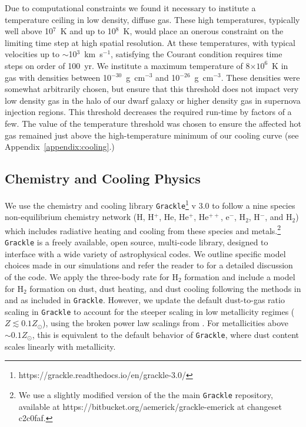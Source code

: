 Due to computational constraints we found it necessary to institute a temperature ceiling in low density, diffuse gas. These high temperatures, typically well above 10$^{7}$~K and up to 10$^{8}$~K, would place an onerous constraint on the limiting time step at high spatial resolution. At these temperatures, with typical velocities up to $\sim$10$^{3}$~km~s$^{-1}$, satisfying the Courant condition requires time steps on order of 100~yr. We institute a maximum temperature of 8$\times 10^6$~K in gas with densities between 10$^{-30}$~g~cm$^{-3}$ and 10$^{-26}$~g~cm$^{-3}$. These densities were somewhat arbitrarily chosen, but ensure that this threshold does not impact very low density gas in the halo of our dwarf galaxy or higher density gas in supernova injection regions. This threshold decreases the required run-time by factors of a few. The value of the temperature threshold was chosen to ensure the affected hot gas remained just above the high-temperature minimum of our cooling curve (see Appendix~\ref{appendix:cooling}.)

\subsection{Chemistry and Cooling Physics}
\label{ch1:sec:chemistry}

We use the chemistry and cooling library \texttt{Grackle}\footnote{https://grackle.readthedocs.io/en/grackle-3.0/} v 3.0 to follow a nine species non-equilibrium chemistry network (H, H$^+$, He, He$^+$, He$^{++}$, e$^{-}$, H$_2$, H$^{-}$, and H$_{2}$) which includes radiative heating and cooling from these species and metals.\footnote{We use a slightly modified version of the the main \texttt{Grackle} repository, available at https://bitbucket.org/aemerick/grackle-emerick at changeset c2c0faf.} \texttt{Grackle} is a freely available, open source, multi-code library, designed to interface with a wide variety of astrophysical codes. We outline specific model choices made in our simulations and refer the reader to \citet{GrackleMethod} for a detailed discussion of the code. We apply the \citet{Glover2008} three-body rate for H$_{2}$ formation and include a model for H$_2$ formation on dust, dust heating, and dust cooling following the methods in \citet{Omukai2000} and \citet{Omukai2005} as included in \texttt{Grackle}. However, we update the default dust-to-gas ratio scaling in \texttt{Grackle} to account for the steeper scaling in low metallicity regimes ($Z \lesssim 0.1 Z_{\odot}$), using the broken power law scalings from \citet{Remy-Ruyer2014}. For metallicities above $\sim 0.1 Z_{\odot}$, this is equivalent to the default behavior of \texttt{Grackle}, where dust content scales linearly with metallicity.

